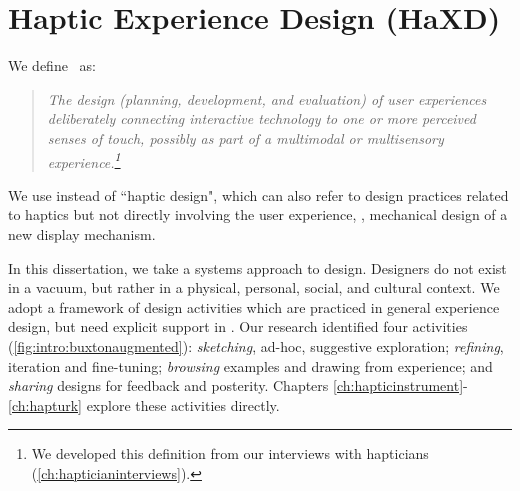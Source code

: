 \section{Haptic Experience Design (HaXD)}
We define \haxd\ as: %
\begin{quote}
\it The design (planning, development, and evaluation) of user experiences  deliberately connecting interactive technology to
one or more perceived senses of touch, possibly as part of a multimodal or multisensory experience.\footnote{We developed this definition from our interviews with hapticians (\autoref{ch:hapticianinterviews}).}
\end{quote}
We use \haxd instead of ``haptic design", which can also refer to design practices related to haptics but not directly involving the user experience, \eg, mechanical design of a new display mechanism. %


In this dissertation, we take a systems approach to design.
Designers do not exist in a vacuum, but rather in a physical, personal, social, and cultural context. %
We adopt a framework of design activities which are practiced in general experience design, but need explicit support in \haxd.
Our research identified four activities (\autoref{fig:intro:buxtonaugmented}): \emph{sketching}, ad-hoc, suggestive exploration; \emph{refining}, iteration and fine-tuning; \emph{browsing} examples and drawing from experience; and \emph{sharing} designs for feedback and posterity.
Chapters \ref{ch:hapticinstrument}-\ref{ch:hapturk} explore these activities directly. %





